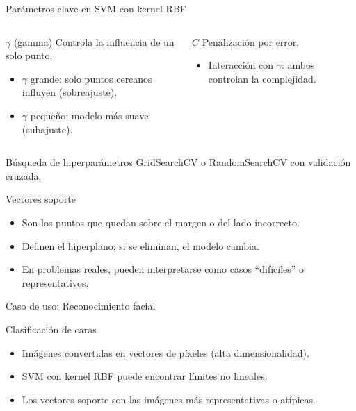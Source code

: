 \documentclass[aspectratio=169, 10pt, xcolor=table]{beamer}
\begin{document}
\begin{frame}{Parámetros clave en SVM con kernel RBF}
    \begin{columns}[t]
        \begin{block}{$\gamma$ (gamma)}
            Controla la influencia de un solo punto.
            \begin{itemize}
                \item $\gamma$ grande: solo puntos cercanos influyen (sobreajuste).
                \item $\gamma$ pequeño: modelo más suave (subajuste).
            \end{itemize}
        \end{block}
        \begin{block}{$C$}
            Penalización por error.
            \begin{itemize}
                \item Interacción con $\gamma$: ambos controlan la complejidad.
            \end{itemize}
        \end{block}
    \end{columns}
    \vspace{0.3cm}
    \begin{exampleblock}{Búsqueda de hiperparámetros}
        GridSearchCV o RandomSearchCV con validación cruzada.
    \end{exampleblock}
\end{frame}

\begin{frame}{Vectores soporte}
    \begin{itemize}
        \item Son los puntos que quedan sobre el margen o del lado incorrecto.
        \item Definen el hiperplano; si se eliminan, el modelo cambia.
        \item En problemas reales, pueden interpretarse como casos ``difíciles'' o representativos.
    \end{itemize}
\end{frame}

\begin{frame}{Caso de uso: Reconocimiento facial}
    \begin{exampleblock}{Clasificación de caras}
        \begin{itemize}
            \item Imágenes convertidas en vectores de píxeles (alta dimensionalidad).
            \item SVM con kernel RBF puede encontrar límites no lineales.
            \item Los vectores soporte son las imágenes más representativas o atípicas.
        \end{itemize}
    \end{exampleblock}
\end{frame}
\end{document}
